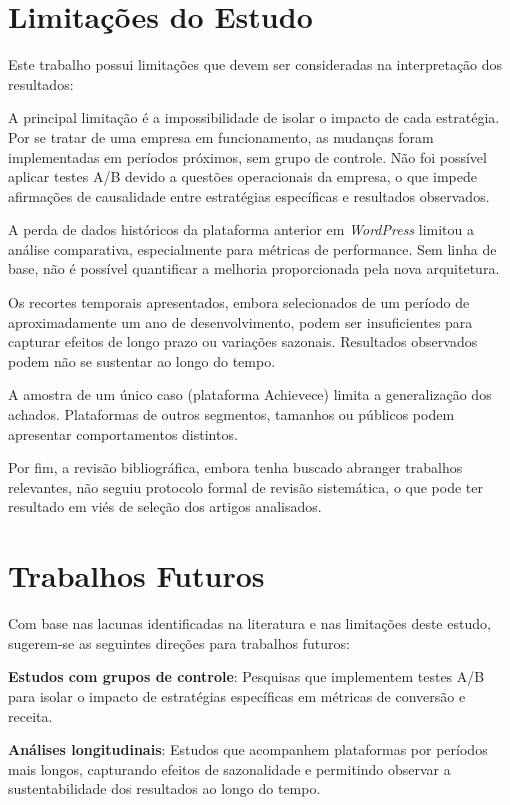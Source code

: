 \section{Limitações do Estudo}

Este trabalho possui limitações que devem ser consideradas na interpretação dos resultados:

A principal limitação é a impossibilidade de isolar o impacto de cada estratégia. Por se tratar de uma empresa em funcionamento, as mudanças foram implementadas em períodos próximos, sem grupo de controle. Não foi possível aplicar testes A/B devido a questões operacionais da empresa, o que impede afirmações de causalidade entre estratégias específicas e resultados observados.

A perda de dados históricos da plataforma anterior em \textit{WordPress} limitou a análise comparativa, especialmente para métricas de performance. Sem linha de base, não é possível quantificar a melhoria proporcionada pela nova arquitetura.

Os recortes temporais apresentados, embora selecionados de um período de aproximadamente um ano de desenvolvimento, podem ser insuficientes para capturar efeitos de longo prazo ou variações sazonais. Resultados observados podem não se sustentar ao longo do tempo.

A amostra de um único caso (plataforma Achievece) limita a generalização dos achados. Plataformas de outros segmentos, tamanhos ou públicos podem apresentar comportamentos distintos.

Por fim, a revisão bibliográfica, embora tenha buscado abranger trabalhos relevantes, não seguiu protocolo formal de revisão sistemática, o que pode ter resultado em viés de seleção dos artigos analisados.

\section{Trabalhos Futuros}

Com base nas lacunas identificadas na literatura e nas limitações deste estudo, sugerem-se as seguintes direções para trabalhos futuros:

\textbf{Estudos com grupos de controle}: Pesquisas que implementem testes A/B para isolar o impacto de estratégias específicas em métricas de conversão e receita.

\textbf{Análises longitudinais}: Estudos que acompanhem plataformas por períodos mais longos, capturando efeitos de sazonalidade e permitindo observar a sustentabilidade dos resultados ao longo do tempo.

